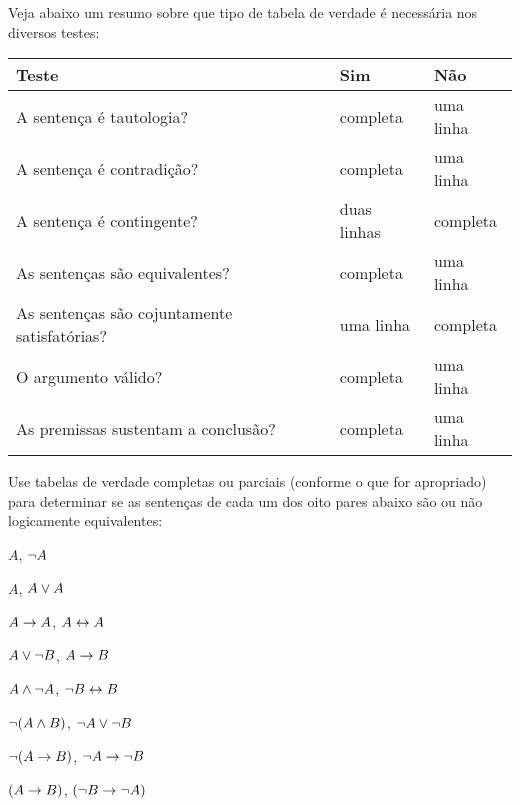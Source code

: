 Veja abaixo um resumo sobre que tipo de tabela de verdade é necessária nos diversos testes:
\begin{center}\label{t:TruthTable}
\begin{tabular}{l l l}
\cline{1-3}
\textbf{Teste} & \textbf{Sim} & \textbf{Não}\\
 \hline
\cline{1-3}
{\footnotesize A sentença é tautologia?} & {\footnotesize completa} & {\footnotesize uma linha} \\
{\footnotesize A sentença é  contradição?} &  {\footnotesize completa} & {\footnotesize uma linha} \\
{\footnotesize A sentença é contingente?} & {\footnotesize duas linhas} & {\footnotesize completa}\\
{\footnotesize As sentenças são equivalentes?} & {\footnotesize completa}  & {\footnotesize uma linha} \\
{\footnotesize As sentenças são cojuntamente satisfatórias?} & {\footnotesize uma linha} & {\footnotesize completa} \\
{\footnotesize O argumento válido?} & {\footnotesize completa} & {\footnotesize uma linha} \\
{\footnotesize As premissas sustentam a conclusão?} & {\footnotesize completa} & {\footnotesize uma linha}\\
\cline{1-3}
\end{tabular}
\end{center}
\label{table.CompleteVsPartial}


\practiceproblems
\solutions

\solutions
\problempart
\label{pr.TT.equiv3}
Use tabelas de verdade completas ou parciais (conforme o que for apropriado) para determinar se as sentenças de cada um dos oito pares abaixo são ou não logicamente equivalentes:
\begin{earg}
\item $A$, $\neg A$ %
\item $A$, $A \vee A$ %
\item $A\rightarrow A$, $A \leftrightarrow A$ %
\item $A \vee \neg B$, $A\rightarrow B$ %
\item $A \wedge \neg A$, $\neg B \leftrightarrow B$ %
\item $\neg(A \wedge B)$, $\neg A \vee \neg B$ %
\item $\neg(A \rightarrow B)$, $\neg A \rightarrow \neg B$ %
\item $(A \rightarrow B)$, $(\neg B \rightarrow \neg A)$ %
\end{earg}

